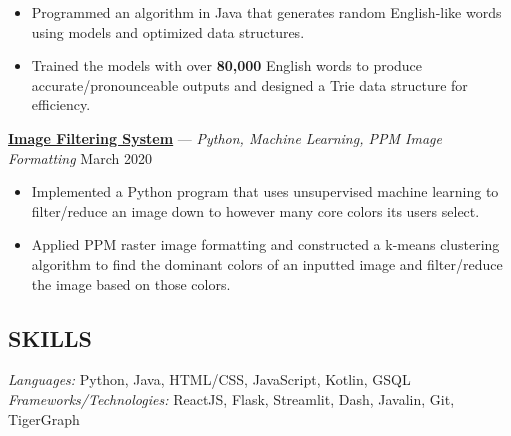 \documentclass[11pt]{res}
\begin{document}
\begin{footnotesize}
\begin{resume}
\begin{itemize}[leftmargin=6.25mm] \itemsep -2pt 
\item Programmed an algorithm in Java that generates random English-like words using models and optimized data structures. 
\vspace{1mm}
\item Trained the models with over \textbf{80,000} English words to produce accurate/pronounceable outputs and designed a Trie data structure for efficiency.
\end{itemize}
\vspace{-2.5mm}
\href{https://github.com/CharlesShi12/ImageFilters}{\textbf{Image Filtering System}} — {\sl Python, Machine Learning, PPM Image Formatting} \hfill March 2020\vspace{-5mm}
\begin{itemize}[leftmargin=6.25mm] \itemsep -2pt 
\item Implemented a Python program that uses unsupervised machine learning to filter/reduce an image down to however many core colors its users select.
\vspace{1mm}
\item Applied PPM raster image formatting and constructed a k-means clustering algorithm to find the dominant colors of an inputted image and filter/reduce the image based on those colors. 
\end{itemize}
\begin{small}
\section{SKILLS}
\end{small} 
\vspace{.5mm}
{\sl Languages:} 
Python, Java, HTML/CSS, JavaScript, Kotlin, GSQL \\
{\sl Frameworks/Technologies:} ReactJS, Flask, Streamlit, Dash, Javalin, Git, TigerGraph

\end{resume}
\end{footnotesize}
\end{document}
